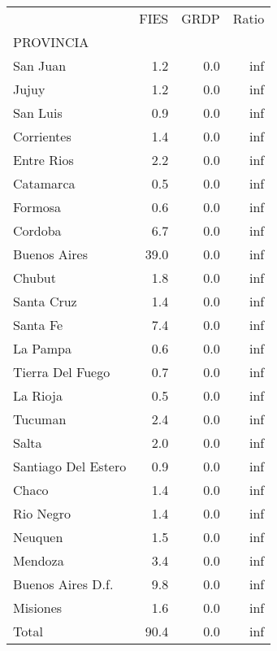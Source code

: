 \begin{tabular}{lrrr}
\toprule
{} &  FIES &  GRDP &  Ratio \\
PROVINCIA           &       &       &        \\
\midrule
San Juan            &   1.2 &   0.0 &    inf \\
Jujuy               &   1.2 &   0.0 &    inf \\
San Luis            &   0.9 &   0.0 &    inf \\
Corrientes          &   1.4 &   0.0 &    inf \\
Entre Rios          &   2.2 &   0.0 &    inf \\
Catamarca           &   0.5 &   0.0 &    inf \\
Formosa             &   0.6 &   0.0 &    inf \\
Cordoba             &   6.7 &   0.0 &    inf \\
Buenos Aires        &  39.0 &   0.0 &    inf \\
Chubut              &   1.8 &   0.0 &    inf \\
Santa Cruz          &   1.4 &   0.0 &    inf \\
Santa Fe            &   7.4 &   0.0 &    inf \\
La Pampa            &   0.6 &   0.0 &    inf \\
Tierra Del Fuego    &   0.7 &   0.0 &    inf \\
La Rioja            &   0.5 &   0.0 &    inf \\
Tucuman             &   2.4 &   0.0 &    inf \\
Salta               &   2.0 &   0.0 &    inf \\
Santiago Del Estero &   0.9 &   0.0 &    inf \\
Chaco               &   1.4 &   0.0 &    inf \\
Rio Negro           &   1.4 &   0.0 &    inf \\
Neuquen             &   1.5 &   0.0 &    inf \\
Mendoza             &   3.4 &   0.0 &    inf \\
Buenos Aires D.f.   &   9.8 &   0.0 &    inf \\
Misiones            &   1.6 &   0.0 &    inf \\
Total               &  90.4 &   0.0 &    inf \\
\bottomrule
\end{tabular}
